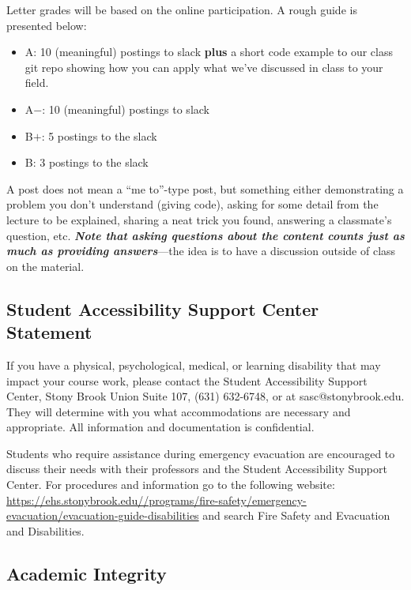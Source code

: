 \documentclass[11pt]{article}
\begin{document}
\noindent Letter grades will be based on the online participation.  A
rough guide is presented below:
\begin{itemize}
\item {\sf A\phantom{+}}: 10 (meaningful) postings to slack {\bf plus}
  a short code example to our class git repo showing how you can apply what
  we've discussed in class to your field.

\item {\sf A$-$}: 10 (meaningful) postings to slack

\item {\sf B$+$}: 5 postings to the slack

\item {\sf B\phantom{+}}:  3 postings to the slack
\end{itemize}
A post does not mean a ``me to''-type post, but something either
demonstrating a problem you don't understand (giving code), asking for
some detail from the lecture to be explained, sharing a neat trick you
found, answering a classmate's question, etc.  {\em \bfseries Note that asking
questions about the content counts just as much as providing
answers}---the idea is to have a discussion outside of class on the
material.



\subsection*{Student Accessibility Support Center Statement}

If you have a physical, psychological, medical, or learning disability
that may impact your course work, please contact the Student
Accessibility Support Center, Stony Brook Union Suite 107, (631)
632-6748, or at sasc@stonybrook.edu. They will determine with you what
accommodations are necessary and appropriate. All information and
documentation is confidential.

Students who require assistance during emergency evacuation are
encouraged to discuss their needs with their professors and the
Student Accessibility Support Center. For procedures and information
go to the following website:
{\small \url{https://ehs.stonybrook.edu//programs/fire-safety/emergency-evacuation/evacuation-guide-disabilities}}
and search Fire Safety and Evacuation and Disabilities.

\subsection*{Academic Integrity}
\end{document}
